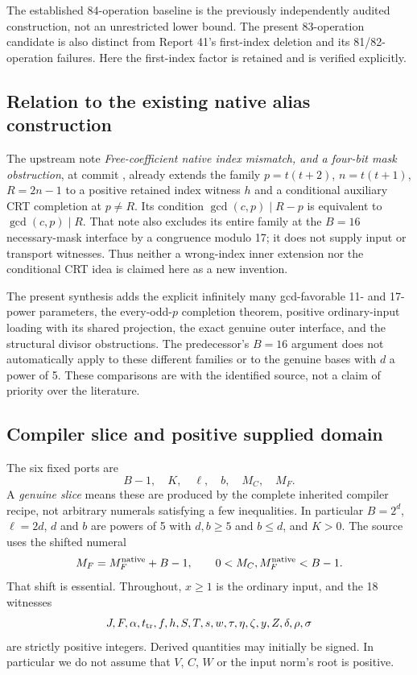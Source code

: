 \documentclass[11pt,letterpaper]{article}
\theoremstyle{definition}\newtheorem{definition}[theorem]{Definition}
\theoremstyle{remark}\newtheorem{remark}[theorem]{Remark}
\newcommand{\code}[1]{\texttt{\detokenize{#1}}}
\begin{document}
The established 84-operation baseline is the previously independently
audited construction, not an unrestricted lower bound. The present
83-operation candidate is also distinct from Report 41's first-index
deletion and its 81/82-operation failures. Here the first-index factor is
retained and is verified explicitly.

\subsection{Relation to the existing native alias construction}
The upstream note \emph{Free-coefficient native index mismatch, and a
four-bit mask obstruction}, at commit
\code{53c34b0129bbde7b5d79e520ff3e004cf6f7c07a}, already extends the
family $p=t(t+2)$, $n=t(t+1)$, $R=2n-1$ to a positive retained index
witness $h$ and a conditional auxiliary CRT completion at $p\ne R$.
Its condition $\gcd(c,p)\mid R-p$ is equivalent to
$\gcd(c,p)\mid R$. That note also excludes its entire family at the
$B=16$ necessary-mask interface by a congruence modulo 17; it does not
supply input or transport witnesses. Thus neither a wrong-index inner
extension nor the conditional CRT idea is claimed here as a new invention.

The present synthesis adds the explicit infinitely many gcd-favorable
11- and 17-power parameters, the every-odd-$p$ completion theorem, positive
ordinary-input loading with its shared projection, the exact genuine
outer interface, and the structural divisor obstructions. The predecessor's
$B=16$ argument does not automatically apply to these different families
or to the genuine bases with $d$ a power of 5. These comparisons are with
the identified source, not a claim of priority over the literature.

\subsection{Compiler slice and positive supplied domain}
The six fixed ports are
\[
 B-1,\quad K,\quad \ell,\quad b,\quad M_C,\quad M_F.
\]
A \emph{genuine slice} means these are produced by the complete inherited
compiler recipe, not arbitrary numerals satisfying a few inequalities.
In particular $B=2^d$, $\ell=2d$, $d$ and $b$ are powers of 5 with
$d,b\ge5$ and $b\le d$, and $K>0$. The source uses the shifted numeral
\[
 M_F=M_F^{\rm native}+B-1,\qquad
 0<M_C,M_F^{\rm native}<B-1.
\]
That shift is essential. Throughout, $x\ge1$ is the ordinary input, and
the 18 witnesses
\[
 J,F,\alpha,t_{\rm tr},f,h,S,T,s,w,\tau,\eta,\zeta,y,Z,
 \delta,\rho,\sigma
\]
are strictly positive integers. Derived quantities may initially be signed.
In particular we do not assume that $V$, $C$, $W$ or the input norm's root
is positive.
\end{document}

